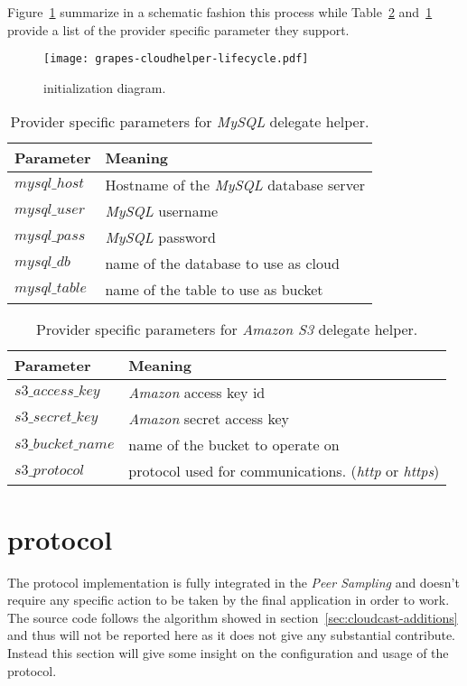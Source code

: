 Figure~\ref{fig:grapes-cloudhelper-lifecycle} summarize in a schematic
fashion this process while Table~\ref{tbl:grapes-cloudhelper-libs3}
and~\ref{tbl:grapes-cloudhelper-mysql} provide a list of the provider
specific parameter they support.

\begin{figure}[H]
  \centering
  \texttt{[image: grapes-cloudhelper-lifecycle.pdf]}
  \caption{\cloudhelper initialization diagram.}
  \label{fig:grapes-cloudhelper-lifecycle}
\end{figure}

\begin{table}[H]
  \centering
  \begin{tabular}{|l|l|}
  \hline
  Parameter & Meaning \\
  \hline
  \hline
  $mysql\_host$ & Hostname of the \textit{MySQL} database server \\
  $mysql\_user$ & \textit{MySQL} username \\
  $mysql\_pass$ & \textit{MySQL} password \\
  $mysql\_db$ & name of the database to use as cloud \\
  $mysql\_table$ & name of the table to use as bucket \\
  \hline
  \end{tabular}
  \caption{Provider specific parameters for \textit{MySQL} delegate helper.}
  \label{tbl:grapes-cloudhelper-mysql}
\end{table}

\begin{table}[H]
  \centering
  \begin{tabular}{|l|l|}
  \hline
  Parameter & Meaning \\
  \hline
  \hline
  $s3\_access\_key$ & \textit{Amazon} access key id \\
  $s3\_secret\_key$ & \textit{Amazon} secret access key \\
  $s3\_bucket\_name$ & name of the bucket to operate on \\
  $s3\_protocol$ & protocol used for communications. (\emph{http}  or
  \emph{https}) \\
  \hline
  \end{tabular}
  \caption{Provider specific parameters for \textit{Amazon S3} delegate helper.}
  \label{tbl:grapes-cloudhelper-libs3}
\end{table}

\section{\cloudcast \peersampling protocol}
The \cloudcast \peersampling protocol implementation is fully
integrated in the \grapes \textit{Peer Sampling} \api and doesn't
require any specific action to be taken by the final application in
order to work. The source code follows the algorithm showed in
section~\ref{sec:cloudcast-additions} and thus will not be reported
here as it does not give any substantial contribute. Instead this
section will give some insight on the configuration and usage of the
protocol.

